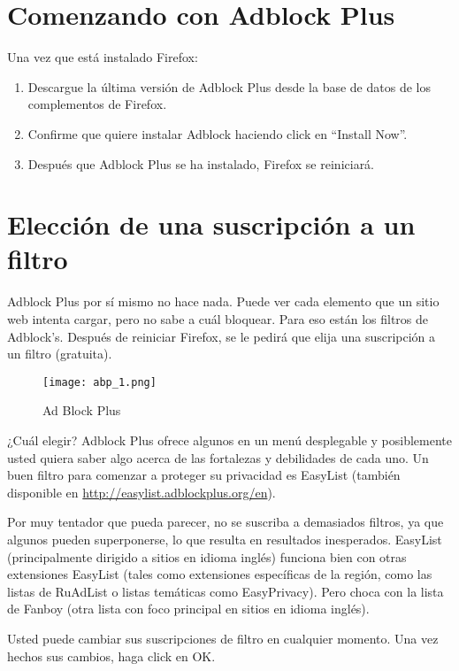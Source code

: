 \documentclass[10pt,a5paper,twoside,,]{book}
\providecommand{\tightlist}{%
  \setlength{\itemsep}{0pt}\setlength{\parskip}{0pt}}
\begin{document}
\section{Comenzando con Adblock Plus}\label{comenzando-con-adblock-plus}

Una vez que está instalado Firefox:

\begin{enumerate}
\def\labelenumi{\arabic{enumi}.}
\tightlist
\item
  Descargue la última versión de Adblock Plus desde la base de datos de
  los complementos de Firefox.
\item
  Confirme que quiere instalar Adblock haciendo click en ``Install
  Now''.
\item
  Después que Adblock Plus se ha instalado, Firefox se reiniciará.
\end{enumerate}

\section{Elección de una suscripción a un
filtro}\label{elecciuxf3n-de-una-suscripciuxf3n-a-un-filtro}

Adblock Plus por sí mismo no hace nada. Puede ver cada elemento que un
sitio web intenta cargar, pero no sabe a cuál bloquear. Para eso están
los filtros de Adblock's. Después de reiniciar Firefox, se le pedirá que
elija una suscripción a un filtro (gratuita).

\begin{figure}[htbp]
\centering
\texttt{[image: abp\_1.png]}
\caption{Ad Block Plus}
\end{figure}

¿Cuál elegir? Adblock Plus ofrece algunos en un menú desplegable y
posiblemente usted quiera saber algo acerca de las fortalezas y
debilidades de cada uno. Un buen filtro para comenzar a proteger su
privacidad es EasyList (también disponible en
\url{http://easylist.adblockplus.org/en}).

Por muy tentador que pueda parecer, no se suscriba a demasiados filtros,
ya que algunos pueden superponerse, lo que resulta en resultados
inesperados. EasyList (principalmente dirigido a sitios en idioma
inglés) funciona bien con otras extensiones EasyList (tales como
extensiones específicas de la región, como las listas de RuAdList o
listas temáticas como EasyPrivacy). Pero choca con la lista de Fanboy
(otra lista con foco principal en sitios en idioma inglés).

Usted puede cambiar sus suscripciones de filtro en cualquier momento.
Una vez hechos sus cambios, haga click en OK.
\end{document}
